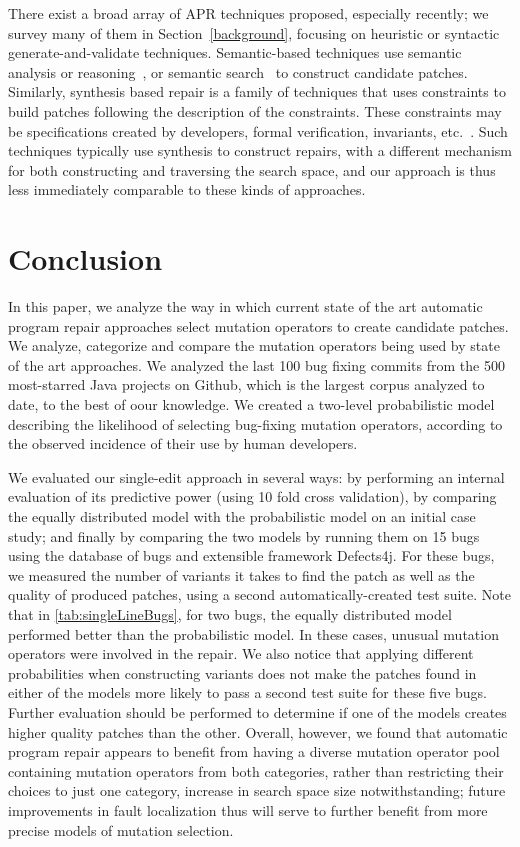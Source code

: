 \documentclass[conference]{IEEEtran}
\begin{document}
There exist a broad array of APR techniques proposed, especially recently; we
survey many of them in Section~\ref{background}, focusing on heuristic or
syntactic generate-and-validate techniques.  Semantic-based techniques use
semantic analysis or reasoning~\cite{nguyen13,mechtaev15,Mechtaev2016}, or
semantic search~\cite{ke15} to construct candidate patches.  Similarly,
synthesis based repair is a family of techniques that uses constraints to build
patches following the description of the constraints. These constraints may be
specifications created by developers, formal verification, invariants,
etc.~\cite{jin11,wei10}.  Such techniques typically use synthesis to construct
repairs, with a different mechanism for both constructing and traversing the
search space, and our approach is thus less immediately comparable to these kinds of approaches.
 

\section{Conclusion} \label{conclusion}

In this paper, we analyze the way in which current state of the art automatic 
program repair approaches select mutation operators to create candidate 
patches. We analyze, categorize and compare the mutation operators being used by 
state of the art approaches. We analyzed the last 100 bug fixing commits from the
500 most-starred Java projects on Github, which is the largest corpus analyzed
to date, to the best of oour knowledge.  We created a two-level probabilistic model describing
the likelihood of selecting bug-fixing mutation operators, according to the
observed incidence of their use by human developers. 

We evaluated our single-edit approach in several ways: by performing an internal evaluation of 
its predictive power (using 10 fold cross 
validation), by comparing the equally distributed model with the probabilistic
 model on an initial case study; and finally by comparing the two models 
 by running them on 15 bugs using the database of bugs and extensible 
framework Defects4j. For these bugs, we measured the number of variants it takes to find the 
patch as well as the quality of produced patches, using a second automatically-created test suite.
Note that in \ref{tab:singleLineBugs}, for two bugs,
the equally distributed model performed better than the probabilistic
model. In these cases, unusual mutation operators were involved in the repair. 
We also notice that applying different probabilities when constructing variants
does not make the patches found in either of the models more likely to pass a
second test suite for these five bugs. Further evaluation should be performed to
determine if one of the models creates higher quality patches than the other. 
Overall, however, we found that automatic program repair appears to benefit
from having a diverse mutation operator pool containing mutation operators from both categories,
rather than restricting their choices to just one category, increase in search
space size notwithstanding; future improvements in fault localization thus will
serve to further benefit from more precise models of mutation selection. 
\end{document}
